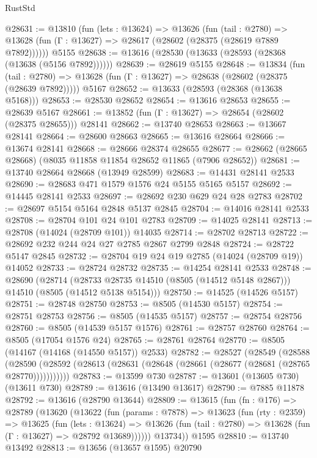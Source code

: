 \begin{lexlean}{RustStd}
\begin{coremodule}
@28631 := @13810
    (fun (lets : @13624) =>
    @13626
      (fun (tail : @2780) =>
      @13628 (fun (Γ : @13627) => @28617 (@28602 (@28375 (@28619 @7889 @7892))))))
    @5155
@28638 := @13616 (@28530 (@13633 (@28593 (@28368 (@13638 (@5156 @7892))))))
@28639 := @28619 @5155
@28648 := @13834
    (fun (tail : @2780) => @13628 (fun (Γ : @13627) => @28638 (@28602 (@28375 (@28639 @7892)))))
    @5167
@28652 := @13633 (@28593 (@28368 (@13638 @5168)))
@28653 := @28530 @28652
@28654 := @13616 @28653
@28655 := @28639 @5167
@28661 := @13852 (fun (Γ : @13627) => @28654 (@28602 (@28375 @28655))) @28141
@28662 := @13740 @28653
@28663 := @13667 @28141
@28664 := @28600 @28663
@28665 := @13616 @28664
@28666 := @13674 @28141
@28668 := @28666 @28374 @28655
@28677 := @28662 (@28665 @28668) (@8035 @11858 @11854 @28652 @11865 (@7906 @28652))
@28681 := @13740 @28664 @28668 (@13949 @28599)
@28683 := @14431 @28141 @2533
@28690 := @28683 @471 @1579 @1576 @24 @5155 @5165 @5157
@28692 := @14445 @28141 @2533
@28697 := @28692 @230 @629 @24 @28 @2783
@28702 := @28697 @5154 @5164 @2848 @5137 @2845
@28704 := @14016 @28141 @2533
@28708 := @28704 @101 @24 @101 @2783
@28709 := @14025 @28141
@28713 := @28708 (@14024 (@28709 @101)) @14035
@28714 := @28702 @28713
@28722 := @28692 @232 @244 @24 @27 @2785 @2867 @2799 @2848
@28724 := @28722 @5147 @2845
@28732 := @28704 @19 @24 @19 @2785 (@14024 (@28709 @19)) @14052
@28733 := @28724 @28732
@28735 := @14254 @28141 @2533
@28748 := @28690
    (@28714 (@28733 @28735 @14510 (@8505 (@14512 @5148 @2867))) @14510 (@8505 (@14512 @5138 @5154)))
@28750 := @14525 (@14526 @5157)
@28751 := @28748 @28750
@28753 := @8505 (@14530 @5157)
@28754 := @28751 @28753
@28756 := @8505 (@14535 @5157)
@28757 := @28754 @28756
@28760 := @8505 (@14539 @5157 @1576)
@28761 := @28757 @28760
@28764 := @8505 (@17054 @1576 @24)
@28765 := @28761 @28764
@28770 := @8505 (@14167 (@14168 (@14550 @5157)) @2533)
@28782 := @28527
    (@28549
      (@28588
        (@28590 (@28592 (@28613 (@28631 (@28648 (@28661 (@28677 (@28681 (@28765 @28770)))))))))))
@28783 := @13599 @730
@28787 := @13601 (@13605 @730) (@13611 @730)
@28789 := @13616 (@13490 @13617)
@28790 := @7885 @11878
@28792 := @13616 (@28790 @13644)
@28809 := @13615
    (fun (fn : @176) =>
    @28789
      (@13620
        (@13622
          (fun (params : @7878) =>
          @13623
            (fun (rty : @2359) =>
            @13625
              (fun (lets : @13624) =>
              @13626 (fun (tail : @2780) => @13628 (fun (Γ : @13627) => @28792 @13689))))))
        @13734))
    @1595
@28810 := @13740 @13492
@28813 := @13656 (@13657 @1595) @20790

\end{coremodule}
\end{lexlean}
